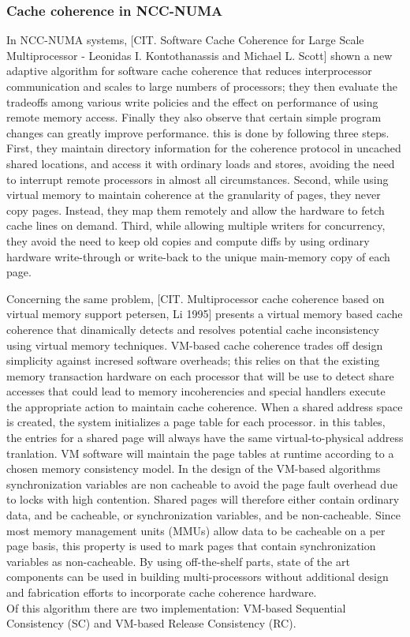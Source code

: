 \documentclass[a4paper,10pt]{article}
\begin{document}
\begin{multicols}{2}
\subsubsection{Cache coherence in NCC-NUMA}
In NCC-NUMA systems, [CIT. Software Cache Coherence for Large Scale Multiprocessor - Leonidas I. Kontothanassis and Michael L. Scott] shown a new adaptive algorithm for software cache coherence that reduces interprocessor communication and scales to large numbers of processors; they then evaluate the tradeoffs among various write policies and the effect on performance of using remote memory access. Finally they also observe that certain simple program changes can greatly improve performance. this is done by following three steps. First, they maintain directory information for the coherence protocol in uncached shared locations, and access it with ordinary loads and stores, avoiding the need to interrupt remote processors in almost all circumstances. Second, while using virtual memory to maintain coherence at the granularity of pages, they never copy pages. Instead, they map them remotely and allow the hardware to fetch cache lines on demand. Third, while allowing multiple writers for concurrency, they avoid the need to keep old copies and compute diffs by using ordinary hardware write-through or write-back to the unique main-memory copy of each page. \par 
\parindent 10mm Concerning the same problem, [CIT. Multiprocessor cache coherence based on virtual memory support  petersen, Li 1995] presents a virtual memory based cache coherence that dinamically detects and resolves potential cache inconsistency using virtual memory techniques. VM-based cache coherence trades off design simplicity against incresed software overheads; this relies on that the existing memory transaction hardware on each processor that will be use to detect share accesses that could lead to memory incoherencies and special handlers execute the appropriate action to maintain cache coherence.
When a shared address space is created, the system initializes a page table for each processor. in this tables, the entries for a shared page will always have the same virtual-to-physical address tranlation. VM software will maintain the page tables at runtime according to a chosen memory consistency model. In the design of the VM-based algorithms synchronization variables are non cacheable to avoid the page fault overhead due to locks with high contention. Shared pages will therefore either contain ordinary data, and be cacheable, or synchronization variables, and be non-cacheable. Since most memory management units (MMUs) allow data to be cacheable on a per page basis, this property is used to mark pages that contain synchronization variables as non-cacheable.
By using off-the-shelf parts, state of the art components can be used in building multi-processors without additional design and fabrication efforts to incorporate cache coherence hardware.\\
Of this algorithm there are two implementation: VM-based Sequential Consistency (SC) and VM-based Release Consistency (RC).


\end{multicols}
\end{document}
